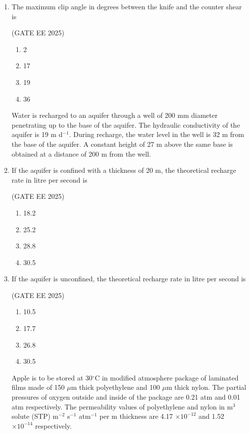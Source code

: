 \documentclass[journal,12pt,onecolumn]{IEEEtran}
\theoremstyle{remark}
\begin{document}
\begin{enumerate}
\item The maximum clip angle in degrees between the knife and the counter shear is

\hfill(GATE EE 2025)

\begin{multicols}{4}
\begin{enumerate}
\item 2
\item 17
\item 19
\item 36
\end{enumerate}
\end{multicols}

Water is recharged to an aquifer through a well of 200 mm diameter penetrating up to the base of the aquifer. The hydraulic conductivity of the aquifer is 19 m d$^{-1}$. During recharge, the water level in the well is 32 m from the base of the aquifer. A constant height of 27 m above the same base is obtained at a distance of 200 m from the well.

\item If the aquifer is confined with a thickness of 20 m, the theoretical recharge rate in litre per second is

\hfill(GATE EE 2025)

\begin{multicols}{4}
\begin{enumerate}
\item 18.2
\item 25.2
\item 28.8
\item 30.5
\end{enumerate}
\end{multicols}

\item If the aquifer is unconfined, the theoretical recharge rate in litre per second is

\hfill(GATE EE 2025)

\begin{multicols}{4}
\begin{enumerate}
\item 10.5
\item 17.7
\item 26.8
\item 30.5
\end{enumerate}
\end{multicols}

Apple is to be stored at 30$^\circ$C in modified atmosphere package of laminated films made of 150 $\mu$m thick polyethylene and 100 $\mu$m thick nylon. The partial pressures of oxygen outside and inside of the package are 0.21 atm and 0.01 atm respectively. The permeability values of polyethylene and nylon in m$^{3}$ solute (STP) m$^{-2}$ s$^{-1}$ atm$^{-1}$ per m thickness are 4.17 $\times 10^{-12}$ and 1.52 $\times 10^{-14}$ respectively.


\end{enumerate}
\end{document}
